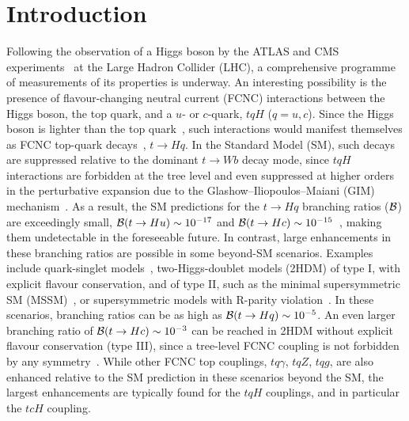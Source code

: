 
\section{Introduction}
\label{sec:intro}

Following the observation of a Higgs boson by the ATLAS and CMS experiments~\cite{Aad:2012tfa,Chatrchyan:2012ufa} at
the Large Hadron Collider (LHC), a comprehensive programme of measurements of its properties is underway.
An interesting possibility is the presence of flavour-changing neutral current (FCNC) interactions 
between the Higgs boson, the top quark, and a $u$- or $c$-quark, $tqH$ ($q=u,c$). Since the Higgs boson is lighter than the top quark~\cite{Aad:2015zhl}, 
such interactions would manifest themselves as FCNC top-quark decays~\cite{Agashe:2013hma}, $t\to H q$.  
In the Standard Model (SM), such decays are suppressed relative to the dominant $t\to Wb$ decay mode, since $tqH$ 
interactions are forbidden at the tree level and even suppressed at higher orders in the perturbative expansion due to the 
Glashow--Iliopoulos--Maiani (GIM) mechanism~\cite{Glashow:1970gm}.  As a result, the SM predictions for the $t \to Hq$ branching 
ratios ($\mathcal{B}$) are exceedingly small, $\mathcal{B}(t\to Hu) \sim 10^{-17} $ and $\mathcal{B}(t\to Hc) \sim 10^{-15}$~\cite{Eilam:1990zc,Mele:1998ag,AguilarSaavedra:2004wm,Zhang:2013xya}, making them undetectable in the foreseeable future.
In contrast, large enhancements in these branching ratios are possible in some beyond-SM scenarios.
Examples include quark-singlet models~\cite{AguilarSaavedra:2002kr}, two-Higgs-doublet models (2HDM) of type I, with explicit flavour conservation,
and of type II, such as the minimal supersymmetric SM (MSSM)~\cite{Bejar:2000ub, Guasch:1999jp,Cao:2007dk}, or supersymmetric models
with R-parity violation~\cite{Eilam:2001dh}. In these scenarios, branching ratios can be as high as $\mathcal{B}(t\to Hq) \sim 10^{-5}$. 
An even larger branching ratio of  $\mathcal{B}(t\to Hc) \sim 10^{-3}$ can be reached in 2HDM without explicit flavour conservation (type III),
since a tree-level FCNC coupling is not forbidden by any symmetry~\cite{Cheng:1987rs,Baum:2008qm,Chen:2013qta}. 
While other FCNC top couplings, $tq\gamma$, $tqZ$, $tqg$, are also enhanced relative to the SM prediction in these scenarios beyond the SM, 
the largest enhancements are typically found for the $tqH$ couplings, and in particular the $tcH$ coupling. 

